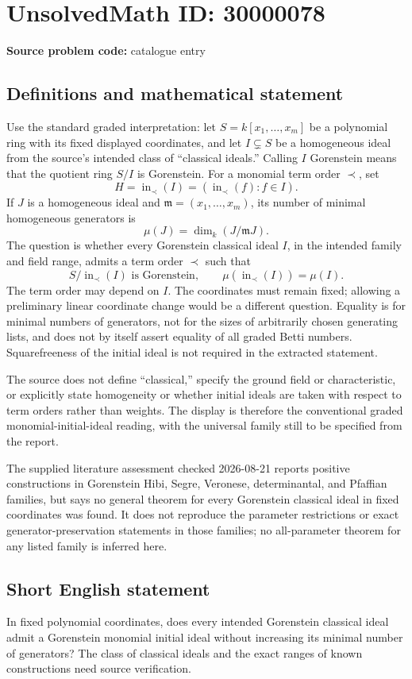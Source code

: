 \documentclass[11pt]{article}
\begin{document}
\section*{UnsolvedMath ID: 30000078}
\textbf{Source problem code:} catalogue entry
\subsection{Definitions and mathematical statement}
Use the standard graded interpretation: let \(S=k[x_1,\ldots,x_m]\) be a polynomial ring with its fixed displayed coordinates, and let \(I\subsetneq S\) be a homogeneous ideal from the source's intended class of ``classical ideals.'' Calling \(I\) Gorenstein means that the quotient ring \(S/I\) is Gorenstein. For a monomial term order \(\prec\), set
\[
H=\operatorname{in}_{\prec}(I)
=(\operatorname{in}_{\prec}(f):f\in I).
\]
If \(J\) is a homogeneous ideal and \(\mathfrak m=(x_1,\ldots,x_m)\), its number of minimal homogeneous generators is
\[
\mu(J)=\dim_k(J/\mathfrak m J).
\]
The question is whether every Gorenstein classical ideal \(I\), in the intended family and field range, admits a term order \(\prec\) such that
\[
S/\operatorname{in}_{\prec}(I)\text{ is Gorenstein},
\qquad
\mu(\operatorname{in}_{\prec}(I))=\mu(I).
\]
The term order may depend on \(I\). The coordinates must remain fixed; allowing a preliminary linear coordinate change would be a different question. Equality is for minimal numbers of generators, not for the sizes of arbitrarily chosen generating lists, and does not by itself assert equality of all graded Betti numbers. Squarefreeness of the initial ideal is not required in the extracted statement.

The source does not define ``classical,'' specify the ground field or characteristic, or explicitly state homogeneity or whether initial ideals are taken with respect to term orders rather than weights. The display is therefore the conventional graded monomial-initial-ideal reading, with the universal family still to be specified from the report.

The supplied literature assessment checked 2026-08-21 reports positive constructions in Gorenstein Hibi, Segre, Veronese, determinantal, and Pfaffian families, but says no general theorem for every Gorenstein classical ideal in fixed coordinates was found. It does not reproduce the parameter restrictions or exact generator-preservation statements in those families; no all-parameter theorem for any listed family is inferred here.
\subsection{Short English statement}
In fixed polynomial coordinates, does every intended Gorenstein classical ideal admit a Gorenstein monomial initial ideal without increasing its minimal number of generators? The class of classical ideals and the exact ranges of known constructions need source verification.
\end{document}
